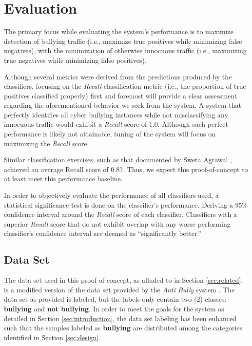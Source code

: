 \documentclass[conference]{sig-alternate-05-2015}
\begin{document}
\section{Evaluation}\label{sec:evaluation}

The primary focus while evaluating the system's performance is to maximize
detection of bullying traffic (i.e., maximize true positives while minimizing
false negatives), with the minimization of otherwise innocuous traffic (i.e.,
maximizing true negatives while minimizing false positives).

Although several metrics were derived from the predictions produced by the
classifiers, focusing on the \textit{Recall} classification metric
(i.e., the proportion of true positives classified properly) first and foremost
will provide a clear assessment regarding the aforementioned behavior we seek
from the system. A system that perfectly identifies all cyber bullying instances
while not misclassifying any innocuous traffic would exhibit a \textit{Recall}
score of 1.0. Although such perfect performance is likely not attainable, tuning
of the system will focus on maximizing the \textit{Recall} score.

Similar classification exercises, such as that documented by Sweta Agrawal
\cite{agrawal2018deep}, achieved an average Recall score of \( 0.87 \). Thus,
we expect this proof-of-concept to at least meet this performance baseline.

In order to objectively evaluate the performance of all classifiers used, a
statistical significance test is done on the classifier's performance. Deriving
a $95$\% confidence interval around the \textit{Recall} score of each
classifier. Classifiers with a superior \textit{Recall} score that do not
exhibit overlap with any worse performing classifier's confidence interval are
deemed as ``significantly better.''

\subsection{Data Set}\label{subsec:eval_dataset}
The data set used in this proof-of-concept, as alluded to in Section
\ref{sec:related}, is a modified version of the data set provided by the
\textit{Anti Bully} system \cite{Li2016}. The data set as provided is labeled,
but the labels only contain two (2) classes: \textbf{bullying} and
\textbf{not bullying}. In order to meet the goals for the system as detailed in
Section \ref{sec:introduction}, the data set labeling has been
enhanced such that the samples labeled as \textbf{bullying} are distributed
among the categories identified in Section \ref{sec:design}.
\end{document}

